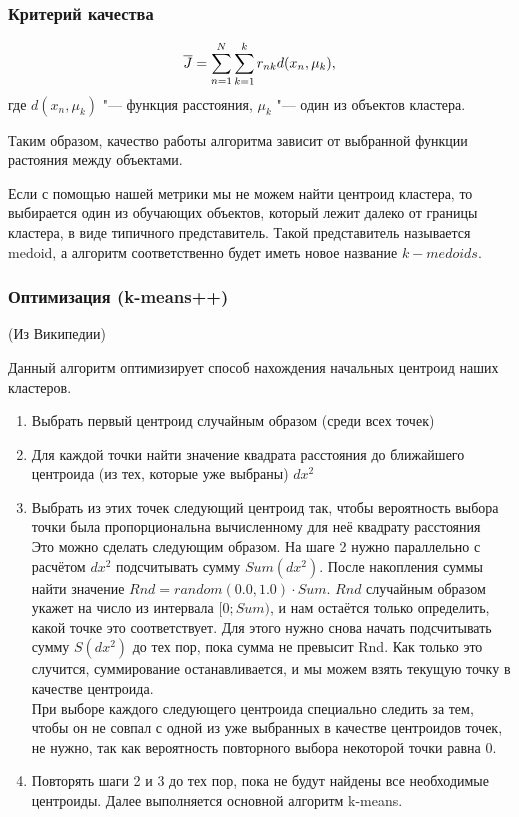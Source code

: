 \subsubsection{Критерий качества}
\[
{\overline{J}} = \sum\limits_{n=1}^N \sum\limits_{k=1}^k r_{nk} d(x_n,\mu_k),
\]
где $d(x_n,\mu_k)$ "--- функция расстояния, 
$\mu_k$ "--- один из объектов кластера.

Таким образом, качество работы алгоритма зависит от выбранной функции растояния между объектами.
\begin{Zam}
Если с помощью нашей метрики мы не можем найти  центроид кластера, то выбирается один из обучающих объектов, который лежит далеко от границы кластера, в виде типичного представитель. Такой представитель называется medoid, а алгоритм соответственно будет иметь новое название $k-medoids$.
\end{Zam}

\subsubsection{Оптимизация (k-means++)}
(Из Википедии)

Данный алгоритм оптимизирует способ нахождения начальных центроид наших кластеров.
\begin{enumerate}
\item Выбрать первый центроид случайным образом (среди всех точек)
\item Для каждой точки найти значение квадрата расстояния до ближайшего центроида (из тех, которые уже выбраны) $dx^2$
\item Выбрать из этих точек следующий центроид так, чтобы вероятность выбора точки была пропорциональна вычисленному для неё квадрату расстояния\\
Это можно сделать следующим образом. На шаге 2 нужно параллельно с расчётом $dx^2$ подсчитывать сумму $Sum(dx^2)$. После накопления суммы найти значение $Rnd = random(0.0,1.0) \cdot Sum$. $Rnd$ случайным образом укажет на число из интервала $[0; Sum)$, и нам остаётся только определить, какой точке это соответствует. Для этого нужно снова начать подсчитывать сумму $S(dx^2)$ до тех пор, пока сумма не превысит Rnd. Как только это случится, суммирование останавливается, и мы можем взять текущую точку в качестве центроида.\\
При выборе каждого следующего центроида специально следить за тем, чтобы он не совпал с одной из уже выбранных в качестве центроидов точек, не нужно, так как вероятность повторного выбора некоторой точки равна 0.
\item Повторять шаги 2 и 3 до тех пор, пока не будут найдены все необходимые центроиды.
Далее выполняется основной алгоритм k-means.
\end{enumerate}

